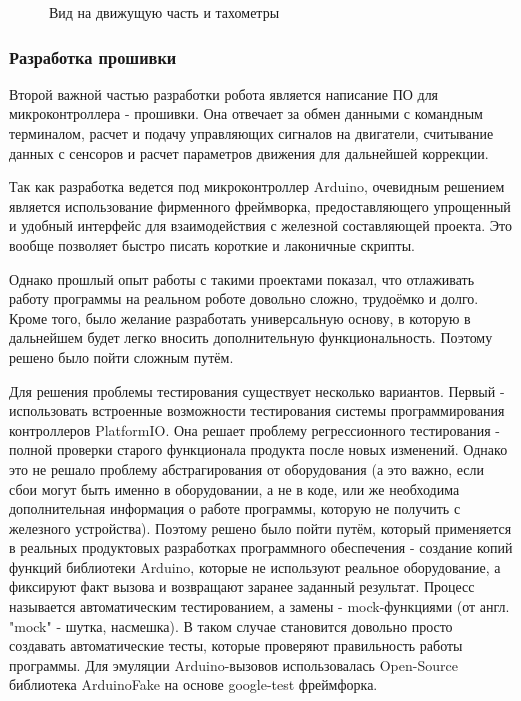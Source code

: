 \documentclass[14pt,a4paper,russian]{scrartcl}
\begin{document}
\begin{figure}[h!]
    \caption{Вид на движущую часть и тахометры}
    \label{fig:robocar_common_sight_encoders}
\end{figure}

\subsubsection{Разработка прошивки}
Второй важной частью разработки робота является написание ПО для микроконтроллера 
- прошивки. Она отвечает за обмен данными с командным терминалом,
расчет и подачу управляющих сигналов на двигатели, считывание данных
с сенсоров и расчет параметров движения для дальнейшей коррекции.

Так как разработка ведется под микроконтроллер Arduino, очевидным
решением является использование фирменного фреймворка, 
предоставляющего упрощенный и удобный интерфейс для взаимодействия
с железной составляющей проекта. Это вообще позволяет быстро писать 
короткие и лаконичные скрипты.

Однако прошлый опыт работы с такими проектами показал, что отлаживать 
работу программы на реальном роботе довольно сложно, трудоёмко и долго.
Кроме того, было желание разработать универсальную основу, в которую
в дальнейшем будет легко вносить дополнительную функциональность. Поэтому
решено было пойти сложным путём.

Для решения проблемы тестирования существует несколько вариантов. 
Первый - использовать встроенные возможности тестирования системы
программирования контроллеров PlatformIO. Она решает проблему регрессионного
тестирования - полной проверки старого функционала продукта после новых изменений.
Однако это не решало проблему абстрагирования от оборудования (а это важно, если
сбои могут быть именно в оборудовании, а не в коде, или же необходима
дополнительная информация о работе программы, которую не получить с железного
устройства). Поэтому решено было пойти путём, который применяется в реальных
продуктовых разработках программного обеспечения - создание копий функций
библиотеки Arduino, которые не используют реальное оборудование, а 
фиксируют факт вызова и возвращают заранее заданный результат. Процесс называется
автоматическим тестированием, а замены - mock-функциями (от англ. "mock" - шутка, насмешка).
В таком случае становится довольно просто создавать автоматические тесты,
которые проверяют правильность работы программы. Для эмуляции Arduino-вызовов
использовалась Open-Source библиотека ArduinoFake на основе google-test фреймфорка.
\end{document}
